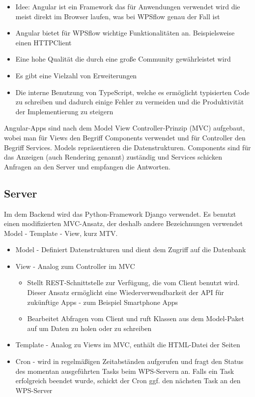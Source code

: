         \begin{itemize}
            \item Idee: Angular ist ein Framework das für Anwendungen verwendet wird die meist direkt im Browser laufen, was bei WPSflow genau der Fall ist
            \item Angular bietet für WPSflow wichtige Funktionalitäten an. Beispielsweise einen HTTPClient
            \item Eine hohe Qualität die durch eine große Community gewährleistet wird
            \item Es gibt eine Vielzahl von Erweiterungen
            \item Die interne Benutzung von TypeScript, welche es ermöglicht typisierten Code zu schreiben und dadurch einige Fehler zu vermeiden und die Produktivität der Implementierung zu steigern
        \end{itemize}

        \noindent Angular-Apps sind nach dem \gls{Model View Controller}-Prinzip (MVC) aufgebaut, wobei man für Views den Begriff Components verwendet und für Controller den Begriff Services. Models repräsentieren die Datenstrukturen. Components sind für das Anzeigen (auch Rendering genannt) zuständig und Services schicken Anfragen an den Server und empfangen die Antworten.
        
        \subsection{Server}
        
        Im dem Backend wird das Python-Framework \gls{Django} verwendet. Es benutzt einen modifizierten MVC-Ansatz, der deshalb andere Bezeichnungen verwendet Model - Template - View, kurz MTV.
        
        \begin{itemize}
            \item Model - Definiert Datenstrukturen und dient dem Zugriff auf die Datenbank
            \item View - Analog zum Controller im MVC
            
            \begin{itemize}
                \item Stellt REST-Schnittstelle zur Verfügung, die vom Client benutzt wird. Dieser Ansatz ermöglicht eine Wiederverwendbarkeit der API für zukünftige Apps - zum Beispiel Smartphone Apps
                \item Bearbeitet Abfragen vom Client und ruft Klassen aus dem Model-Paket auf um Daten zu holen oder zu schreiben
            \end{itemize}
            \item Template - Analog zu Views im MVC, enthält die HTML-Datei der Seiten 
            \item \gls{Cron} - wird in regelmäßigen Zeitabständen aufgerufen und fragt den Status des momentan ausgeführten Tasks beim WPS-Servern an. Falls ein Task erfolgreich beendet wurde, schickt der Cron ggf. den nächsten Task an den WPS-Server
        \end{itemize}
        
